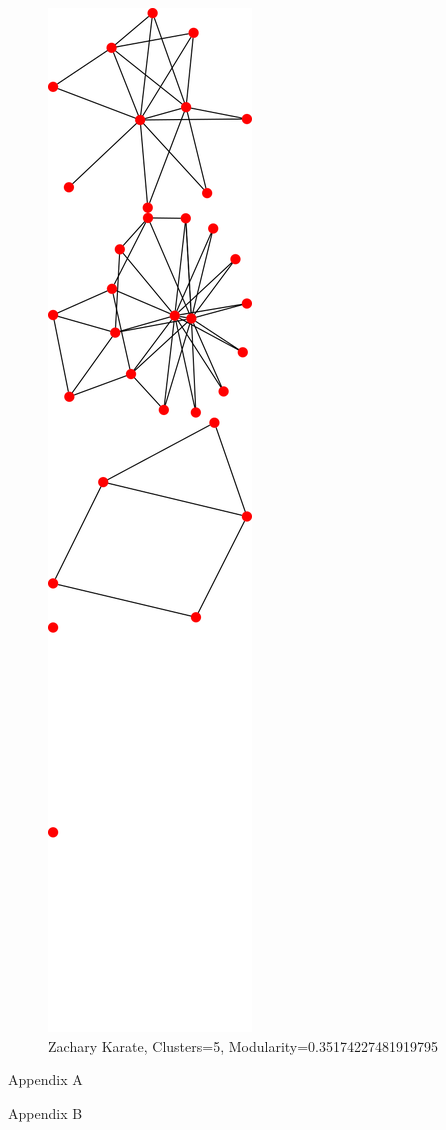 \documentclass{article}
\begin{document}
\begin{figure}[H]
  \centering
  \caption{Zachary Karate, Clusters=5, Modularity=0.35174227481919795}
  \includegraphics[scale=.2]{5-karate.png}
\end{figure}
\clearpage

\appendix
\newpage
Appendix A


\newpage
Appendix B

\end{document}
